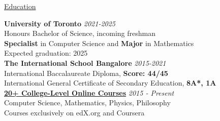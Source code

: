 \documentclass{resume} %
\begin{document}

\begin{rSection}{\href{google.com}{Education}}

{\bf University of Toronto} \hfill {\em 2021-2025} \\ 
Honours Bachelor of Science, incoming freshman \\
\textbf{Specialist} in Computer Science and \textbf{Major} in Mathematics \smallskip \\
Expected graduation: 2025  \\

{\bf The International School Bangalore} \hfill {\em 2015-2021} \\ 
International Baccalaureate Diploma, \textbf{Score: 44/45}  \\
International General Certificate of Secondary Education, \textbf{8A*, 1A}\\

{\bf \href{https://nitvishn-website.netlify.app/education}{20+ College-Level Online Courses}} \hfill{\em 2015 - Present}\\
Computer Science, Mathematics, Physics, Philosophy  \\
Courses exclusively on edX.org and Coursera\\

\end{rSection}

\end{document}
